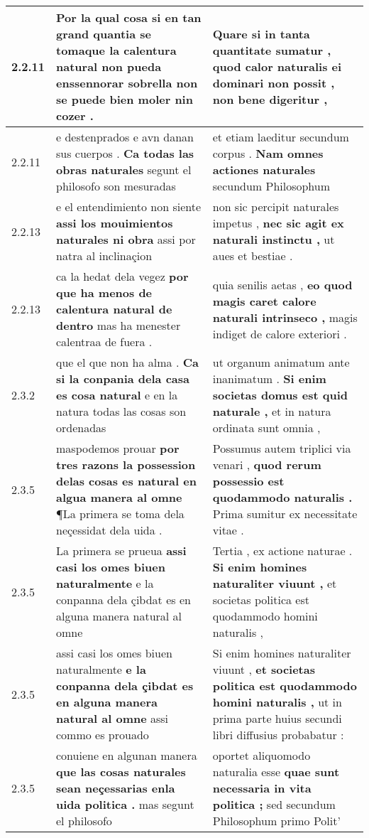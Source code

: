 \begin{tabular}{|p{1cm}|p{6.5cm}|p{6.5cm}|}
2.2.11 & Por la qual cosa si en tan grand quantia se \textbf{ tomaque la calentura natural non pueda } enssennorar sobrella non se puede bien moler nin cozer . & Quare si in tanta quantitate sumatur , \textbf{ quod calor naturalis } ei dominari non possit , non bene digeritur , \\\hline
2.2.11 & e destenprados e avn danan sus cuerpos . \textbf{ Ca todas las obras naturales } segunt el philosofo son mesuradas & et etiam laeditur secundum corpus . \textbf{ Nam omnes actiones naturales } secundum Philosophum \\\hline
2.2.13 & e el entendimiento non siente \textbf{ assi los mouimientos naturales ni obra } assi por natra al inclinaçion & non sic percipit naturales impetus , \textbf{ nec sic agit ex naturali instinctu , } ut aues et bestiae . \\\hline
2.2.13 & ca la hedat dela vegez \textbf{ por que ha menos de calentura natural de dentro } mas ha menester calentraa de fuera . & quia senilis aetas , \textbf{ eo quod magis caret calore naturali intrinseco , } magis indiget de calore exteriori . \\\hline
2.3.2 & que el que non ha alma . \textbf{ Ca si la conpania dela casa es cosa natural } e en la natura todas las cosas son ordenadas & ut organum animatum ante inanimatum . \textbf{ Si enim societas domus est quid naturale , } et in natura ordinata sunt omnia , \\\hline
2.3.5 & maspodemos prouar \textbf{ por tres razons la possession delas cosas es natural en algua manera al omne } ¶La primera se toma dela neçessidat dela uida . & Possumus autem triplici via venari , \textbf{ quod rerum possessio est quodammodo naturalis . } Prima sumitur ex necessitate vitae . \\\hline
2.3.5 & La primera se prueua \textbf{ assi casi los omes biuen naturalmente } e la conpanna dela çibdat es en alguna manera natural al omne & Tertia , ex actione naturae . \textbf{ Si enim homines naturaliter viuunt , } et societas politica est quodammodo homini naturalis , \\\hline
2.3.5 & assi casi los omes biuen naturalmente \textbf{ e la conpanna dela çibdat es en alguna manera natural al omne } assi commo es prouado & Si enim homines naturaliter viuunt , \textbf{ et societas politica est quodammodo homini naturalis , } ut in prima parte huius secundi libri diffusius probabatur : \\\hline
2.3.5 & conuiene en algunan manera \textbf{ que las cosas naturales sean neçessarias enla uida politica . } mas segunt el philosofo & oportet aliquomodo naturalia esse \textbf{ quae sunt necessaria in vita politica ; } sed secundum Philosophum primo Polit’ \\\hline

\end{tabular}
